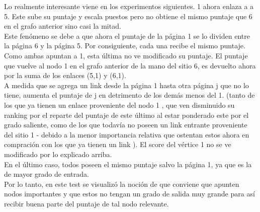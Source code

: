 Lo realmente interesante viene en los experimentos siguientes. 1 ahora enlaza a a 5. Este sube su puntaje y escala puestos pero no obtiene el mismo puntaje que 6 en el grafo anterior sino casi la mitad.\\
Este fenómeno se debe a que ahora el puntaje de la página 1 se lo dividen entre la página 6 y la página 5. Por consiguiente, cada una recibe el mismo puntaje. Como ambas apuntan a 1, esta última no ve modificado su puntaje. El puntaje que vuelve al nodo 1 en el grafo anterior de la mano del sitio 6, es devuelto ahora por la suma de los enlaces (5,1) y (6,1). \\

A medida que se agrega un link desde la página 1 hasta otra página j que no lo tiene, aumenta el puntaje de j en detrimento de los demás menos del 1. (tanto de los que ya tienen un enlace proveniente del nodo 1 , que ven disminuido su ranking por el reparte del puntaje de este último al estar ponderado este por el grado saliente, como de los que todavía no poseen un link entrante proveniente del sitio 1 - debido a la menor importancia relativa que ostentan estos ahora en compración con los que ya tienen un link ). El score del vértice 1 no se ve modificado por lo explicado arriba.  \\

En el último caso, todos poseen el mismo puntaje salvo la página 1, ya que es la de mayor grado de entrada. \\
Por lo tanto, en este test se visualizó la noción de que conviene que apunten nodos importantes y que estos no tengan un grado de salida muy grande para así recibir buena parte del puntaje de tal nodo relevante. \\
                                               
